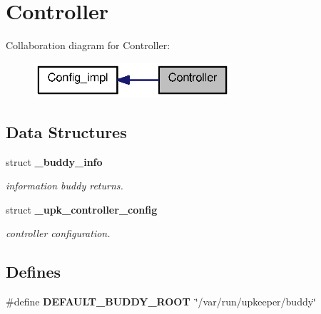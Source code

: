 \section{Controller}
\label{group__controller}
Collaboration diagram for Controller:\nopagebreak
\begin{figure}[H]
\begin{center}
\leavevmode
\includegraphics[width=206pt]{group__controller}
\end{center}
\end{figure}
\subsection*{Data Structures}
\begin{DoxyCompactItemize}
\item 
struct {\bf \_\-buddy\_\-info}
\begin{DoxyCompactList}\small\item\em information buddy returns. \end{DoxyCompactList}\item 
struct {\bf \_\-upk\_\-controller\_\-config}
\begin{DoxyCompactList}\small\item\em controller configuration. \end{DoxyCompactList}\end{DoxyCompactItemize}
\subsection*{Defines}
\begin{DoxyCompactItemize}
\item 
\#define {\bf DEFAULT\_\-BUDDY\_\-ROOT}~\char`\"{}/var/run/upkeeper/buddy\char`\"{}
\end{DoxyCompactItemize}

